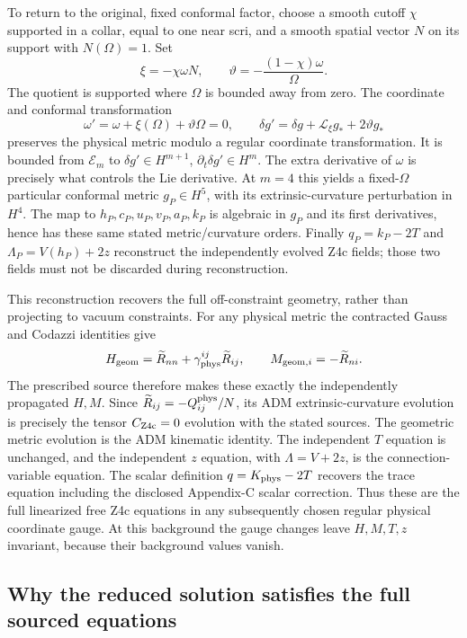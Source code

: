 To return to the original, fixed conformal factor, choose a smooth cutoff
$\chi$ supported in a collar, equal to one near scri, and a smooth spatial
vector $N$ on its support with $N(\Omega)=1$.  Set
\[
 \xi=-\chi\omega N,\qquad
 \vartheta=-\frac{(1-\chi)\omega}{\Omega}.
\]
The quotient is supported where $\Omega$ is bounded away from zero.  The
coordinate and conformal transformation
\[
 \omega'=\omega+\xi(\Omega)+\vartheta\Omega=0,\qquad
 \delta g'=\delta g+\mathcal L_\xi g_*+2\vartheta g_*
\]
preserves the physical metric modulo a regular coordinate transformation.
It is bounded from $\mathcal E_m$ to
$\delta g'\in H^{m+1}$, $\partial_t\delta g'\in H^m$.
The extra derivative of $\omega$ is precisely what controls the Lie
derivative.  At $m=4$ this yields a fixed-$\Omega$ particular conformal metric
$g_P\in H^5$, with its extrinsic-curvature perturbation in $H^4$.
The map to $h_P,c_P,u_P,v_P,a_P,k_P$ is algebraic in $g_P$ and its first
derivatives, hence has these same stated metric/curvature orders.  Finally
$q_P=k_P-2T$ and $\Lambda_P=V(h_P)+2z$ reconstruct the independently evolved
Z4c fields; those two fields must not be discarded during reconstruction.

This reconstruction recovers the full off-constraint geometry, rather than
projecting to vacuum constraints.  For any physical metric the contracted
Gauss and Codazzi identities give
\[
 H_{\rm geom}=\widetilde R_{nn}
       +\gamma_{\rm phys}^{ij}\widetilde R_{ij},\qquad
 M_{{\rm geom},i}=-\widetilde R_{ni}.
\]
The prescribed source therefore makes these exactly the independently
propagated $H,M$.  Since $\widetilde R_{ij}=-Q^{\rm phys}_{ij}/N$, its ADM
extrinsic-curvature evolution is precisely the tensor $C_{\rm Z4c}=0$
evolution with the stated sources.  The geometric metric evolution is the
ADM kinematic identity.  The independent $T$ equation is unchanged, and
the independent $z$ equation, with $\Lambda=V+2z$, is the connection-variable
equation.  The scalar definition $q=K_{\rm phys}-2T$ recovers the trace
equation including the disclosed Appendix-C scalar correction.  Thus these
are the full linearized free Z4c equations in any subsequently chosen
regular physical coordinate gauge.  At this background the gauge changes
leave $H,M,T,z$ invariant, because their background values vanish.

\subsection{Why the reduced solution satisfies the full sourced equations}

